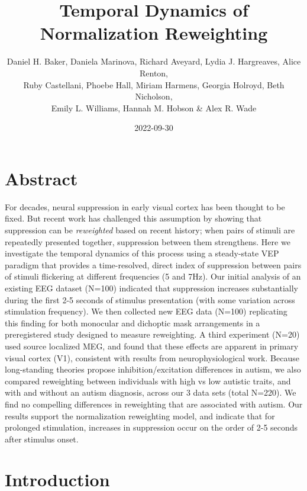 \documentclass[
]{article}
\title{Temporal Dynamics of Normalization Reweighting}
\author{Daniel H. Baker, Daniela Marinova, Richard Aveyard, Lydia J. Hargreaves, Alice Renton,\\
Ruby Castellani, Phoebe Hall, Miriam Harmens, Georgia Holroyd, Beth Nicholson,\\
Emily L. Williams, Hannah M. Hobson \& Alex R. Wade}
\date{2022-09-30}
\begin{document}
\maketitle

\hypertarget{abstract}{%
\section{Abstract}\label{abstract}}

For decades, neural suppression in early visual cortex has been thought to be fixed. But recent work has challenged this assumption by showing that suppression can be \emph{reweighted} based on recent history; when pairs of stimuli are repeatedly presented together, suppression between them strengthens. Here we investigate the temporal dynamics of this process using a steady-state VEP paradigm that provides a time-resolved, direct index of suppression between pairs of stimuli flickering at different frequencies (5 and 7Hz). Our initial analysis of an existing EEG dataset (N=100) indicated that suppression increases substantially during the first 2-5 seconds of stimulus presentation (with some variation across stimulation frequency). We then collected new EEG data (N=100) replicating this finding for both monocular and dichoptic mask arrangements in a preregistered study designed to measure reweighting. A third experiment (N=20) used source localized MEG, and found that these effects are apparent in primary visual cortex (V1), consistent with results from neurophysiological work. Because long-standing theories propose inhibition/excitation differences in autism, we also compared reweighting between individuals with high vs low autistic traits, and with and without an autism diagnosis, across our 3 data sets (total N=220). We find no compelling differences in reweighting that are associated with autism. Our results support the normalization reweighting model, and indicate that for prolonged stimulation, increases in suppression occur on the order of 2-5 seconds after stimulus onset.

\hypertarget{introduction}{%
\section{Introduction}\label{introduction}}
\end{document}
